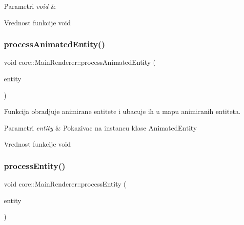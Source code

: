\begin{DoxyParams}{Parametri}
{\em void} & \\
\hline
\end{DoxyParams}
\begin{DoxyReturn}{Vrednost funkcije}
void 
\end{DoxyReturn}
\mbox{\label{classcore_1_1MainRenderer_ac9be9ef0cda2ee739635c0a9bb152df3}} 
\subsubsection{\texorpdfstring{process\+Animated\+Entity()}{processAnimatedEntity()}}
{\footnotesize\ttfamily void core\+::\+Main\+Renderer\+::process\+Animated\+Entity (\begin{DoxyParamCaption}\item[{\hyperlink{classentity_1_1AnimatedEntity}{Animated\+Entity} $\ast$}]{entity }\end{DoxyParamCaption})}



Funkcija obradjuje animirane entitete i ubacuje ih u mapu animiranih entiteta. 


\begin{DoxyParams}{Parametri}
{\em entity} & Pokazivac na instancu klase Animated\+Entity \\
\hline
\end{DoxyParams}
\begin{DoxyReturn}{Vrednost funkcije}
void 
\end{DoxyReturn}
\mbox{\label{classcore_1_1MainRenderer_ae5ffaef40e727ab758d7b2d36ed4e92a}} 
\subsubsection{\texorpdfstring{process\+Entity()}{processEntity()}}
{\footnotesize\ttfamily void core\+::\+Main\+Renderer\+::process\+Entity (\begin{DoxyParamCaption}\item[{\hyperlink{classentity_1_1Entity}{Entity} $\ast$}]{entity }\end{DoxyParamCaption})}



